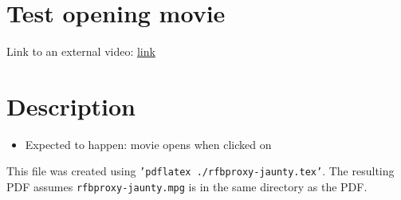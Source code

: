 \documentclass{article}
\begin{document}
\section*{Test opening movie}

Link to an external video: \href{run:rfbproxy-jaunty.mpg}{link}

\section*{Description}
\begin{itemize}
\item Expected to happen: movie opens when clicked on
\end{itemize}

This file was created using \texttt{'pdflatex ./rfbproxy-jaunty.tex'}. The resulting PDF assumes \texttt{rfbproxy-jaunty.mpg} is in the same directory as the PDF.
\end{document}

